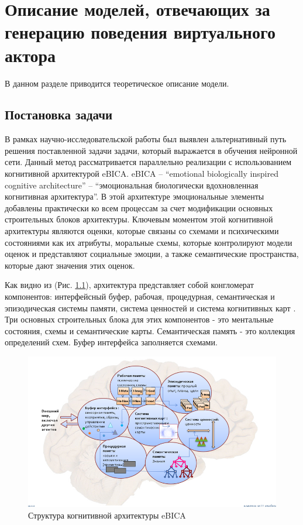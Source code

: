 \chapter{Описание моделей, отвечающих за генерацию поведения виртуального актора}


В данном разделе приводится теоретическое описание модели.




\section{Постановка задачи}

В рамках научно-исследовательской работы был выявлен альтернативный путь решения поставленной задачи задачи, который выражается 
в обучения нейронной сети. Данный метод рассматривается параллельно реализации с использованием когнитивной архитектурой eBICA. 
eBICA – “emotional biologically inspired cognitive architecture” – “эмоциональная биологически вдохновленная когнитивная архитектура”. 
В этой архитектуре эмоциональные элементы добавлены практически ко всем процессам за счет модификации основных строительных блоков архитектуры. 
Ключевым моментом этой когнитивной архитектуры являются оценки, которые связаны со схемами и психическими состояниями как их атрибуты, 
моральные схемы, которые контролируют модели оценок и представляют социальные эмоции, а также семантические пространства, которые дают 
значения этих оценок.

Как видно из (Рис. \ref{pic:ris7}), архитектура представляет собой конгломерат компонентов: интерфейсный буфер, рабочая, процедурная, семантическая 
и эпизодическая системы памяти, система ценностей и система когнитивных карт \cite{Samsonovich01}. Три основных строительных блока для этих компонентов - это 
ментальные состояния, схемы и семантические карты. Семантическая память - это коллекция определений схем. Буфер интерфейса заполняется схемами.

\begin{figure}[h]
\includegraphics[width=0.75\columnwidth]{./img/ris7.png}
\centering  
\caption{Структура когнитивной архитектуры eBICA}
\label{pic:ris7}
\end{figure}

